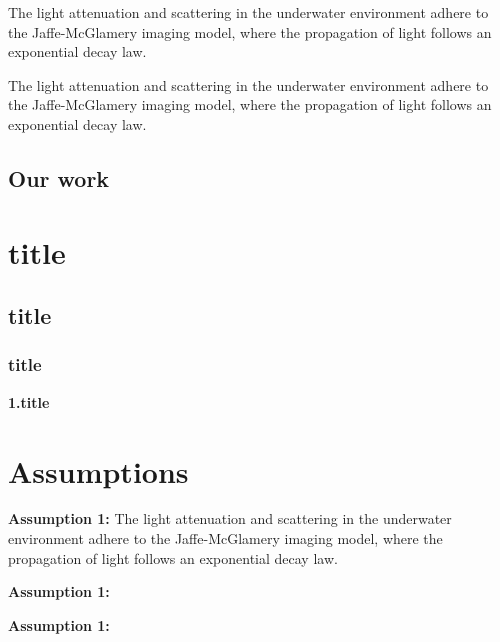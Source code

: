 The light attenuation and scattering in the underwater environment adhere to the Jaffe-McGlamery imaging model, where the propagation of light follows an exponential decay law.

The light attenuation and scattering in the underwater environment adhere to the Jaffe-McGlamery imaging model, where the propagation of light follows an exponential decay law.








\subsection{Our work}


\section{title}
\subsection{title}
\subsubsection{title}

\textbf{1.title}




















\newpage
\section{Assumptions}


\textbf{Assumption 1:} The light attenuation and scattering in the underwater environment adhere to the Jaffe-McGlamery imaging model, where the propagation of light follows an exponential decay law.

\textbf{Assumption 1:}

\textbf{Assumption 1:}




